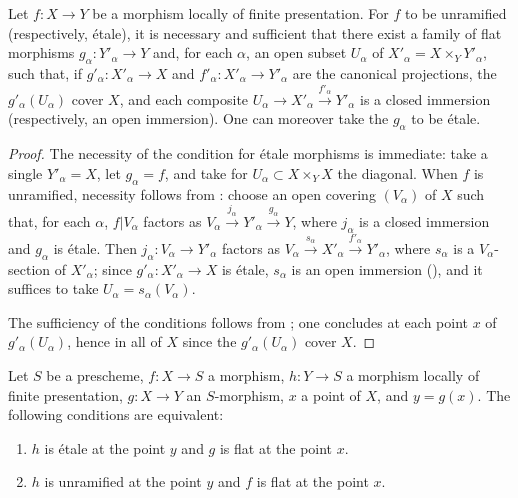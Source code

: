 \begin{corollary}[18.4.8]
\label{IV.18.4.8}
Let $f:X\to Y$ be a morphism locally of finite presentation.
For $f$ to be unramified (respectively, \'etale), it is necessary and sufficient that there exist a family of flat morphisms $g_\alpha:Y'_\alpha\to Y$ and, for each $\alpha$, an open subset $U_\alpha$ of $X'_\alpha=X\times_Y Y'_\alpha$, such that, if $g'_\alpha:X'_\alpha\to X$ and $f'_\alpha:X'_\alpha\to Y'_\alpha$ are the canonical projections, the $g'_\alpha(U_\alpha)$ cover $X$, and each composite $U_\alpha\to X'_\alpha\xrightarrow{f'_\alpha}Y'_\alpha$ is a closed immersion (respectively, an open immersion).
One can moreover take the $g_\alpha$ to be \'etale.
\end{corollary}

\begin{proof}
The necessity of the condition for \'etale morphisms is immediate: take a single $Y'_\alpha=X$, let $g_\alpha=f$, and take for $U_\alpha\subset X\times_Y X$ the diagonal.
When $f$ is unramified, necessity follows from : choose an open covering $(V_\alpha)$ of $X$ such that, for each $\alpha$, $f|V_\alpha$ factors as $V_\alpha\xrightarrow{j_\alpha}Y'_\alpha\xrightarrow{g_\alpha}Y$, where $j_\alpha$ is a closed immersion and $g_\alpha$ is \'etale.
Then $j_\alpha:V_\alpha\to Y'_\alpha$ factors as $V_\alpha\xrightarrow{s_\alpha}X'_\alpha\xrightarrow{f'_\alpha}Y'_\alpha$, where $s_\alpha$ is a $V_\alpha$-section of $X'_\alpha$; since $g'_\alpha:X'_\alpha\to X$ is \'etale, $s_\alpha$ is an open immersion (), and it suffices to take $U_\alpha=s_\alpha(V_\alpha)$.

The sufficiency of the conditions follows from ;
one concludes at each point $x$ of $g'_\alpha(U_\alpha)$, hence in all of $X$ since the $g'_\alpha(U_\alpha)$ cover $X$.
\end{proof}

\begin{proposition}[18.4.9]
\label{IV.18.4.9}
Let $S$ be a prescheme, $f:X\to S$ a morphism, $h:Y\to S$ a morphism locally of finite presentation, $g:X\to Y$ an $S$-morphism, $x$ a point of $X$, and $y=g(x)$.
The following conditions are equivalent:
\begin{enumerate}[label=\emph{\alph*)}]
  \item $h$ is \'etale at the point $y$ and $g$ is flat at the point $x$.
  \item $h$ is unramified at the point $y$ and $f$ is flat at the point $x$.
\end{enumerate}
\end{proposition}

